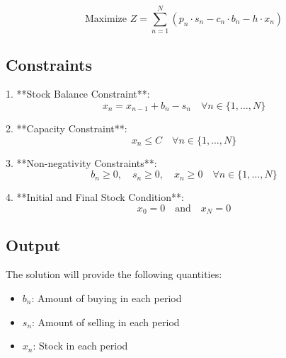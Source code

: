 \documentclass{article}
\begin{document}
\[
\text{Maximize } Z = \sum_{n=1}^{N} \left( p_n \cdot s_n - c_n \cdot b_n - h \cdot x_n \right)
\]

\subsection*{Constraints}

1. **Stock Balance Constraint**:
   \[
   x_n = x_{n-1} + b_n - s_n \quad \forall n \in \{1, \ldots, N\}
   \]
   
2. **Capacity Constraint**:
   \[
   x_n \leq C \quad \forall n \in \{1, \ldots, N\}
   \]

3. **Non-negativity Constraints**:
   \[
   b_n \geq 0, \quad s_n \geq 0, \quad x_n \geq 0 \quad \forall n \in \{1, \ldots, N\}
   \]

4. **Initial and Final Stock Condition**:
   \[
   x_0 = 0 \quad \text{and} \quad x_N = 0
   \]

\subsection*{Output}

The solution will provide the following quantities:

\begin{itemize}
    \item $b_n$: Amount of buying in each period
    \item $s_n$: Amount of selling in each period
    \item $x_n$: Stock in each period
\end{itemize}
\end{document}
